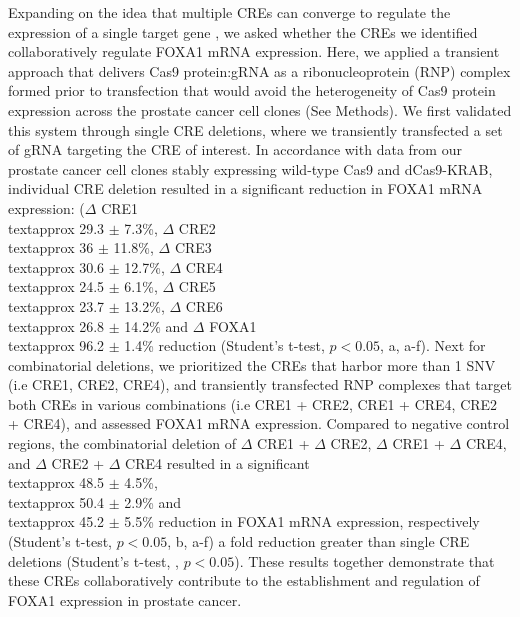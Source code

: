 Expanding on the idea that multiple CREs can converge to regulate the expression of a single target gene \cite{sallariConvergenceDispersedRegulatory2016,baileyNoncodingSomaticInherited2016,pennacchioEnhancersFiveEssential2013}, we asked whether the CREs we identified collaboratively regulate FOXA1 mRNA expression.
Here, we applied a transient approach that delivers Cas9 protein:gRNA as a ribonucleoprotein (RNP) complex formed prior to transfection that would avoid the heterogeneity of Cas9 protein expression across the prostate cancer cell clones (See Methods).
We first validated this system through single CRE deletions, where we transiently transfected a set of gRNA targeting the CRE of interest.
In accordance with data from our prostate cancer cell clones stably expressing wild-type Cas9 and dCas9-KRAB, individual CRE deletion resulted in a significant reduction in FOXA1 mRNA expression: ($\Delta$ CRE1 \\textapprox 29.3 $\pm$ 7.3\%, $\Delta$ CRE2 \\textapprox 36 $\pm$ 11.8\%, $\Delta$ CRE3 \\textapprox 30.6 $\pm$ 12.7\%, $\Delta$ CRE4 \\textapprox 24.5 $\pm$ 6.1\%, $\Delta$ CRE5 \\textapprox 23.7 $\pm$ 13.2\%, $\Delta$ CRE6 \\textapprox 26.8 $\pm$ 14.2\% and $\Delta$ FOXA1 \\textapprox 96.2 $\pm$ 1.4\% reduction (Student's t-test, $p < 0.05$, a, a-f).
Next for combinatorial deletions, we prioritized the CREs that harbor more than 1 SNV (i.e CRE1, CRE2, CRE4), and transiently transfected RNP complexes that target both CREs in various combinations (i.e CRE1 + CRE2, CRE1 + CRE4, CRE2 + CRE4), and assessed FOXA1 mRNA expression.
Compared to negative control regions, the combinatorial deletion of $\Delta$ CRE1 + $\Delta$ CRE2, $\Delta$ CRE1 + $\Delta$ CRE4, and $\Delta$ CRE2 + $\Delta$ CRE4 resulted in a significant \\textapprox 48.5 $\pm$ 4.5\%, \\textapprox 50.4 $\pm$ 2.9\% and \\textapprox 45.2 $\pm$ 5.5\% reduction in FOXA1 mRNA expression, respectively (Student's t-test, $p<0.05$, b, a-f) a fold reduction greater than single CRE deletions (Student's t-test, , $p<0.05$).
These results together demonstrate that these CREs collaboratively contribute to the establishment and regulation of FOXA1 expression in prostate cancer.

